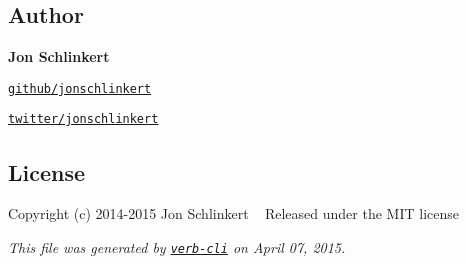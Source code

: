 \subsection*{Author}

{\bfseries Jon Schlinkert}


\begin{DoxyItemize}
\item \href{https://github.com/jonschlinkert}{\tt github/jonschlinkert}
\item \href{http://twitter.com/jonschlinkert}{\tt twitter/jonschlinkert}
\end{DoxyItemize}

\subsection*{License}

Copyright (c) 2014-\/2015 Jon Schlinkert ~\newline
Released under the M\+IT license





{\itshape This file was generated by \href{https://github.com/assemble/verb-cli}{\tt verb-\/cli} on April 07, 2015.} 